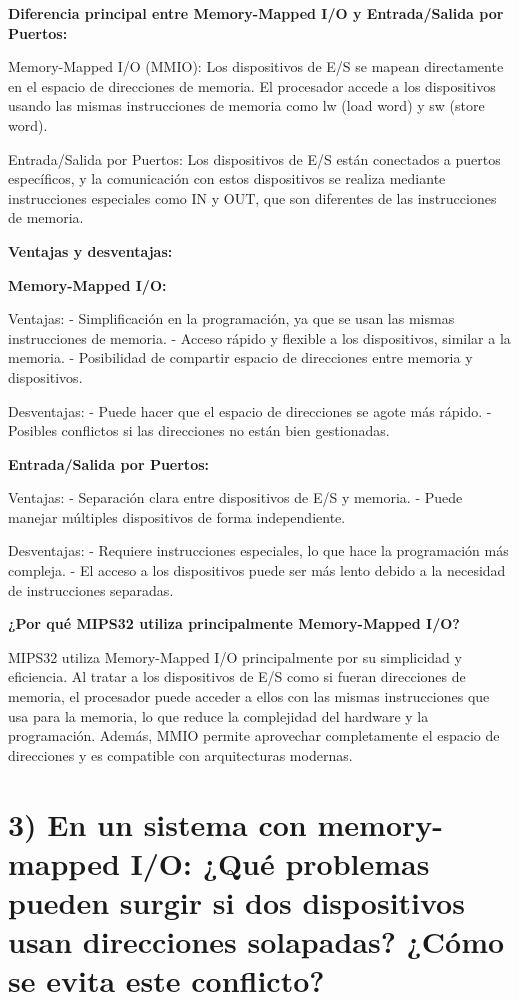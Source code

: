 \documentclass[12pt]{article}
\begin{document}
\textbf{Diferencia principal entre Memory-Mapped I/O y Entrada/Salida por Puertos:}

Memory-Mapped I/O (MMIO): Los dispositivos de E/S se mapean directamente en el espacio de direcciones de memoria. El procesador accede a los dispositivos usando las mismas instrucciones de memoria como lw (load word) y sw (store word).

Entrada/Salida por Puertos: Los dispositivos de E/S están conectados a puertos específicos, y la comunicación con estos dispositivos se realiza mediante instrucciones especiales como IN y OUT, que son diferentes de las instrucciones de memoria.

\textbf{Ventajas y desventajas:}

\textbf{Memory-Mapped I/O:}

Ventajas:
- Simplificación en la programación, ya que se usan las mismas instrucciones de memoria.
- Acceso rápido y flexible a los dispositivos, similar a la memoria.
- Posibilidad de compartir espacio de direcciones entre memoria y dispositivos.

Desventajas:
- Puede hacer que el espacio de direcciones se agote más rápido.
- Posibles conflictos si las direcciones no están bien gestionadas.

\textbf{Entrada/Salida por Puertos:}

Ventajas:
- Separación clara entre dispositivos de E/S y memoria.
- Puede manejar múltiples dispositivos de forma independiente.

Desventajas:
- Requiere instrucciones especiales, lo que hace la programación más compleja.
- El acceso a los dispositivos puede ser más lento debido a la necesidad de instrucciones separadas.

\textbf{¿Por qué MIPS32 utiliza principalmente Memory-Mapped I/O?}

MIPS32 utiliza Memory-Mapped I/O principalmente por su simplicidad y eficiencia. Al tratar a los dispositivos de E/S como si fueran direcciones de memoria, el procesador puede acceder a ellos con las mismas instrucciones que usa para la memoria, lo que reduce la complejidad del hardware y la programación. Además, MMIO permite aprovechar completamente el espacio de direcciones y es compatible con arquitecturas modernas.

\vspace{1cm}
\vspace{1cm}

\section*{3) En un sistema con memory-mapped I/O: ¿Qué problemas pueden surgir si dos dispositivos usan direcciones solapadas? ¿Cómo se evita este conflicto?}
\end{document}
